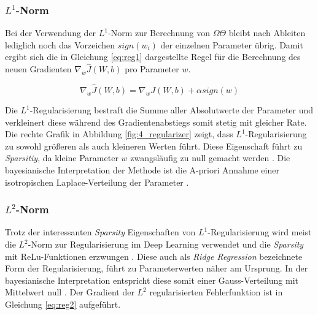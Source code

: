 \subsubsection{$L^1$-Norm}

Bei der Verwendung der $L^1$-Norm zur Berechnung von $\Omega{\Theta}$ bleibt nach Ableiten lediglich noch das Vorzeichen $sign(w_i)$ der einzelnen Parameter übrig. Damit ergibt sich die in Gleichung \ref{eq:reg1} dargestellte Regel für die Berechnung des neuen Gradienten $\nabla_w \hat{J}(W,b)$ pro Parameter $w$. 

\begin{equation}
\label{eq:reg1}
\nabla_w \hat{J}(W,b) = \nabla_w J(W,b) + \alpha sign(w)
\end{equation}

Die $L^1$-Regu\-lari\-sierung bestraft die Summe aller Absolutwerte der Parameter und verkleinert diese während des Gradientenabstiegs somit stetig mit gleicher Rate. Die rechte Grafik in Abbildung \ref{fig:4_regularizer} zeigt, dass $L^1$-Regu\-lari\-sierung zu sowohl größeren als auch kleineren Werten führt. Diese Eigenschaft führt zu \textit{Sparsitiy}, da kleine Parameter $w$ zwangsläufig zu null gemacht werden \cite[vgl.][Kap. 7.2, S. 203]{Bengio2015}.
Die bayesianische Interpretation der Methode ist die A-priori Annahme einer isotropischen Laplace-Verteilung der Parameter \cite[vgl.][Kap. 7.2, S. 206]{Bengio2015}.





\subsubsection{$L^2$-Norm}
Trotz der interessanten \textit{Sparsity} Eigenschaften von $L^1$-Regularisierung wird meist die $L^2$-Norm zur Regularisierung im Deep Learning verwendet und die \textit{Sparsity} mit ReLu-Funktionen erzwungen \cite[vgl. z.B.][]{Krizhevsky2012}.
Diese auch als \textit{Ridge Regression} bezeichnete Form der Regularisierung, führt zu Parameterwerten näher am Ursprung. In der bayesianische Interpretation entspricht diese somit einer Gauss-Verteilung mit Mittelwert null \cite[vgl.][Kap. 7.2, S. 200]{Bengio2015}. Der Gradient der $L^2$ regularisierten Fehlerfunktion ist in Gleichung \ref{eq:reg2} aufgeführt.


